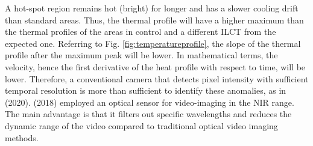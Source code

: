 A hot-spot region remains hot (bright) for longer and has a slower cooling drift than standard areas. Thus, the thermal profile will have a higher maximum than the thermal profiles of the areas in control and a different ILCT from the expected one. Referring to Fig. \ref{fig:temperatureprofile}, the slope of the thermal profile after the maximum peak will be lower. In mathematical terms, the velocity, hence the first derivative of the heat profile with respect to time, will be lower. Therefore, a conventional camera that detects pixel intensity with sufficient temporal resolution is more than sufficient to identify these anomalies, as in \citeauthor{grasso_-situ_2021} (2020). \citeauthor{boone_thermal_2018} (2018) employed an optical sensor for video-imaging in the NIR range. The main advantage is that it filters out specific wavelengths and reduces the dynamic range of the video compared to traditional optical video imaging methods.
